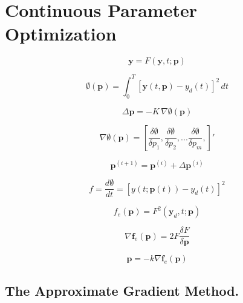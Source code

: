\documentclass[12pt,reqno]{article}
\newcommand{\vect}[1]{\boldsymbol{#1}} %
\begin{document}
\cite{Potts1961}
\cite{Potts1961}

\cite{Potts1961}


\section{Continuous Parameter Optimization}
\begin{equation}
    \vect{y} = F(\vect{y}, t; \vect{p})
\end{equation}

\begin{equation}
    \emptyset(\vect{p}) = \int_0^T{\left[ \vect{y}(t, \vect{p}) - y_d(t)\right]^2} \, dt
\end{equation}

\begin{equation}
    \Delta\vect{p} = -K \, \nabla\emptyset(\vect{p})
\end{equation}

\begin{equation}
    \nabla\emptyset(\vect{p}) = {\left[ \frac{\delta\emptyset}{\delta p_1}, \frac{\delta\emptyset}{\delta p_2}, ... \frac{\delta\emptyset}{\delta p_m}, \right]}'
\end{equation}

\begin{equation}
    \vect{p}^{(i+1)} = \vect{p}^{(i)} + \Delta\vect{p}^{(i)}
\end{equation}

\begin{equation}
    f = \frac{d\emptyset}{dt} = {\left[ y(t; \vect{p}(t)) - y_d(t) \right]}^2
\end{equation}

\begin{equation}
    f_e(\vect{p}) = F^2(\vect{y}_d, t; \vect{p})
\end{equation}

\begin{equation}
    \nabla\vect{f}_e(\vect{p}) = 2F \frac{\delta F}{\delta \vect{p}}
\end{equation}

\begin{equation}
    \vect{p} = -k \nabla \vect{f}_e(\vect{p})
\end{equation}

\subsection{The Approximate Gradient Method.}
\end{document}

